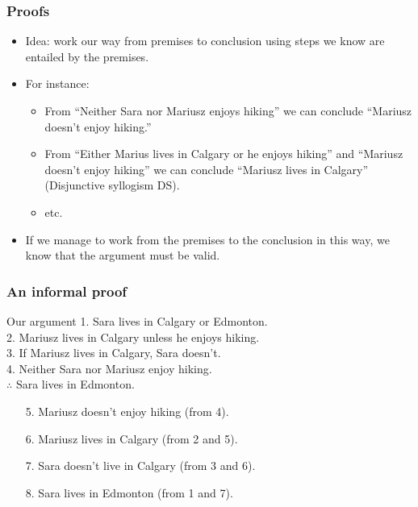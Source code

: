 \begin{frame}
  \frametitle{Proofs}

  \begin{itemize}[<+->]
    \item Idea: work our way from premises to conclusion using steps
    we know are entailed by the premises.
    \item For instance:
      \begin{itemize}[<+->]
        \item From ``Neither Sara nor Mariusz enjoys hiking'' we can
        conclude ``Mariusz doesn't enjoy hiking.''
        \item From ``Either Marius lives in Calgary or he enjoys hiking''
        and ``Mariusz doesn't enjoy hiking'' we can conclude ``Mariusz
        lives in Calgary'' (Disjunctive syllogism DS).
        \item etc.
      \end{itemize}
    \item If we manage to work from the premises to the conclusion in
    this way, we know that the argument must be valid.
  \end{itemize}

\end{frame}

\begin{frame}
  \frametitle{An informal proof}

  \begin{block}{Our argument}
  1. Sara lives in Calgary or Edmonton.\\
  2. Mariusz lives in Calgary unless he enjoys hiking.\\
  3. If Mariusz lives in Calgary, Sara doesn't.\\
  4. Neither Sara nor Mariusz enjoy hiking.\\
  $\therefore$ Sara lives in Edmonton.
  \end{block}

  \begin{enumerate}[<+->]
    \item[5.] Mariusz doesn't enjoy hiking (from 4).
    \item[6.] Mariusz lives in Calgary (from 2 and 5).
    \item[7.] Sara doesn't live in Calgary (from 3 and 6).
    \item[8.] Sara lives in Edmonton (from 1 and 7).
  \end{enumerate}

\end{frame}

